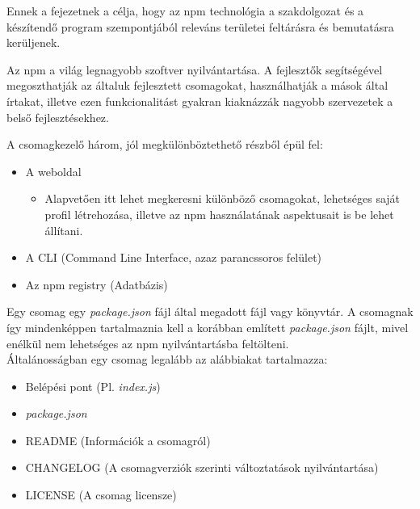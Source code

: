 

Ennek a fejezetnek a célja, hogy az npm technológia a szakdolgozat és a készítendő program szempontjából releváns területei feltárásra és bemutatásra kerüljenek.

Az npm a világ legnagyobb szoftver nyilvántartása. A fejlesztők segítségével megoszthatják az általuk fejlesztett csomagokat, használhatják a mások által írtakat, illetve ezen funkcionalitást gyakran kiaknázzák nagyobb szervezetek a belső fejlesztésekhez.

A csomagkezelő három, jól megkülönböztethető részből épül fel:
\begin{itemize}
	\item A weboldal
	\begin{itemize}
		\item Alapvetően itt lehet megkeresni különböző csomagokat, lehetséges saját profil létrehozása, illetve az npm használatának aspektusait is be lehet állítani.
	\end{itemize}
	\item A CLI (Command Line Interface, azaz parancssoros felület)
	\item Az npm registry (Adatbázis)
\end{itemize}

\begin{flushright}
\cite{npm-about}
\end{flushright}


Egy csomag egy \emph{package.json} fájl által megadott fájl vagy könyvtár. A csomagnak így mindenképpen tartalmaznia kell a korábban említett \emph{package.json} fájlt, mivel enélkül nem lehetséges az npm nyilvántartásba feltölteni.\\

Általánosságban egy csomag legalább az alábbiakat tartalmazza: 

\begin{itemize}
	\item Belépési pont (Pl. \emph{index.js})
	\item \emph{package.json}
	\item README (Információk a csomagról)
	\item CHANGELOG (A csomagverziók szerinti változtatások nyilvántartása)
	\item LICENSE (A csomag licensze)
\end{itemize}

